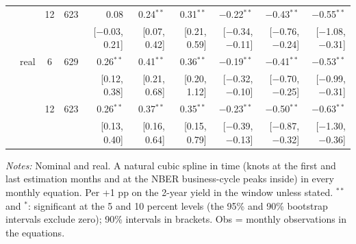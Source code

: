 \begin{longtable}{llcrrrrrrr}
 &  & 12 & 623 & 0.08 & 0.24$^{**}$ & 0.31$^{**}$ & $-$0.22$^{**}$ & $-$0.43$^{**}$ & $-$0.55$^{**}$\\
 & & & & {\scriptsize [$-$0.03, 0.21]} & {\scriptsize [0.07, 0.42]} & {\scriptsize [0.21, 0.59]} & {\scriptsize [$-$0.34, $-$0.11]} & {\scriptsize [$-$0.76, $-$0.24]} & {\scriptsize [$-$1.08, $-$0.31]}\\
 & real & 6 & 629 & 0.26$^{**}$ & 0.41$^{**}$ & 0.36$^{**}$ & $-$0.19$^{**}$ & $-$0.41$^{**}$ & $-$0.53$^{**}$\\
 & & & & {\scriptsize [0.12, 0.38]} & {\scriptsize [0.21, 0.68]} & {\scriptsize [0.20, 1.12]} & {\scriptsize [$-$0.32, $-$0.10]} & {\scriptsize [$-$0.70, $-$0.25]} & {\scriptsize [$-$0.99, $-$0.31]}\\
 &  & 12 & 623 & 0.26$^{**}$ & 0.37$^{**}$ & 0.35$^{**}$ & $-$0.23$^{**}$ & $-$0.50$^{**}$ & $-$0.63$^{**}$\\
 & & & & {\scriptsize [0.13, 0.40]} & {\scriptsize [0.16, 0.64]} & {\scriptsize [0.15, 0.79]} & {\scriptsize [$-$0.39, $-$0.13]} & {\scriptsize [$-$0.87, $-$0.32]} & {\scriptsize [$-$1.30, $-$0.36]}\\
\end{longtable}
\begin{flushleft}\footnotesize\textit{Notes:} Nominal and real. A natural cubic spline in time (knots at the first and last estimation months and at the NBER business-cycle peaks inside) in every monthly equation. Per +1 pp on the 2-year yield in the window unless stated. $^{**}$ and $^{*}$: significant at the 5 and 10 percent levels (the 95\% and 90\% bootstrap intervals exclude zero); 90\% intervals in brackets. Obs = monthly observations in the equations.\end{flushleft}
\endgroup
